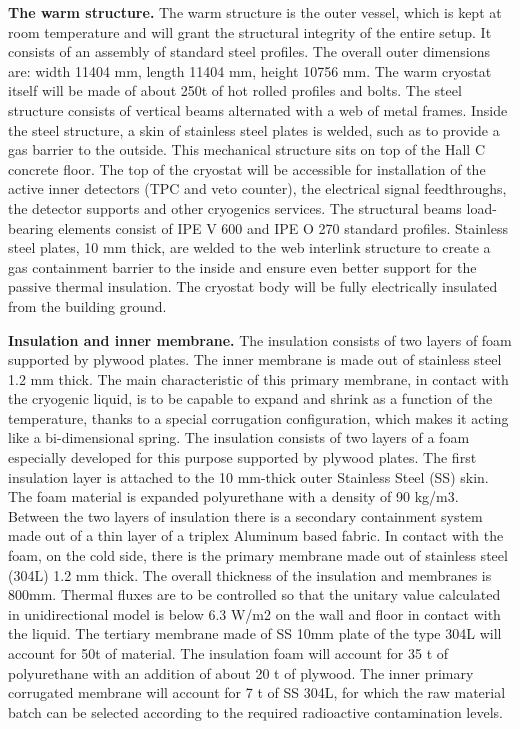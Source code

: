 {\bf The warm structure.} The warm structure is the outer vessel, which is kept at room
temperature and will grant the structural integrity of the entire setup. It consists of an
assembly of standard steel profiles. The overall outer dimensions are: width 11404 mm, length 11404 mm, height 10756 mm. The warm cryostat itself will be made of about 250t of hot rolled profiles and bolts. The steel structure consists of vertical beams alternated with a web of metal frames. Inside the steel structure, a skin of stainless steel plates is welded, such as to provide a gas barrier to the outside. This mechanical structure sits on top of the Hall C concrete floor. The top of the cryostat will be accessible for installation of the active inner detectors (TPC and veto counter), the electrical signal feedthroughs, the detector supports and other cryogenics services. The structural beams load-bearing elements consist of IPE V 600 and IPE O 270 standard profiles. Stainless steel plates, 10 mm thick, are welded to the web interlink structure to create a gas containment barrier to the inside and ensure even better support for the passive thermal insulation. The cryostat body will be fully electrically insulated from the building ground.

{\bf Insulation and inner membrane.} The insulation consists of two layers of foam supported by plywood plates. The inner membrane is made out of stainless steel 1.2 mm thick. The main characteristic of this primary membrane, in contact with the cryogenic liquid, is to be capable to expand and shrink as a function of the temperature, thanks to a special corrugation configuration, which makes it acting like a bi-dimensional spring. The insulation consists of two layers of a foam especially developed for this purpose supported by plywood plates. The first insulation layer is attached to the 10 mm-thick outer Stainless Steel (SS) skin. The foam material is expanded polyurethane with a density of 90 kg/m3. Between the two layers of insulation there is a secondary containment system made out of a thin layer of a triplex Aluminum based fabric.
In contact with the foam, on the cold side, there is the primary membrane made out of
stainless steel (304L) 1.2 mm thick. The overall thickness of the insulation and membranes is 800mm. Thermal fluxes are to be controlled so that the unitary value calculated in
unidirectional model is below 6.3 W/m2 on the wall and floor in contact with the liquid.
The tertiary membrane made of SS 10mm plate of the type 304L will account for 50t of
material. The insulation foam will account for 35 t of polyurethane with an addition of about 20 t of plywood. The inner primary corrugated membrane will account for 7 t of SS 304L, for which the raw material batch can be selected according to the required radioactive contamination levels.


